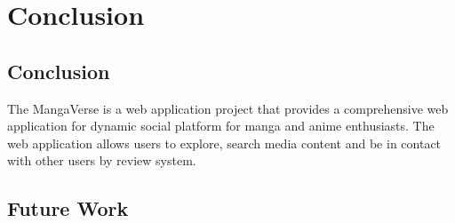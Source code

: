 \chapter{Conclusion}

\section{Conclusion}
The MangaVerse is a web application project that provides a comprehensive web application for 
dynamic social platform for manga and anime enthusiasts. The web application allows users to explore, search media content
and be in contact with other users by review system. 


\section{Future Work}

